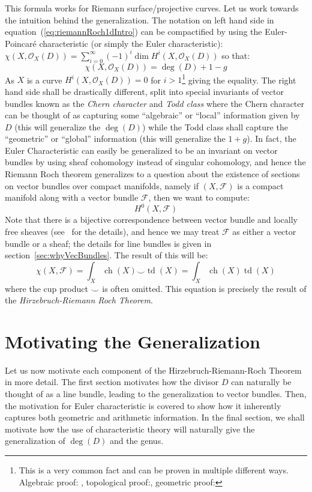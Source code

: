 \documentclass{ut-thesis}
\newcommand{\CF}{{\mathcal{F}}}
\newcommand{\CO}{{\mathcal{O}}}
\newcommand{\ch}{{\operatorname{ch}}}
\renewcommand{\deg}{{\operatorname{deg}}}
\newcommand{\td}{{\operatorname{td}}}
\renewcommand{\ch}{{\operatorname{ch}}}
\begin{document}
This formula works for Riemann surface/projective curves. Let us work towards the intuition behind the
generalization. The notation on left hand side in equation~(\ref{eq:riemannRoch1dIntro}) can be compactified
by using the Euler-Poincar\'e characteristic (or simply the Euler characteristic): $\chi(X, \CO_X(D)) =
\sum_{i=0}^\infty (-1)^i \dim H^i(X, \CO_X(D))$ so that:
\[
  \chi(X, \CO_X(D)) = \deg(D) + 1-g
\]
As $X$ is a curve $H^i(X, \CO_X(D)) = 0$ for $i > 1$\footnote{This is a very common fact and can be proven in
multiple different ways. Algebraic proof: \cite[section~28.3]{NateAlgGeo}, topological
proof:\cite[chapter~3]{NateAlgTop}, geometric proof:\cite[chapter~3]{NateKTheory}} giving the equality. The
right hand side shall be drastically different, split into special invariants of vector bundles known as the
\emph{Chern character} and \emph{Todd class} where the Chern character can be thought of as capturing some ``algebraic'' or
``local'' information given by $D$ (this will generalize the $\deg(D)$) while the Todd class shall capture the
``geometric'' or ``global'' information (this will generalize the $1+g$). In fact, the Euler Characteristic
can easily be generalized to be an invariant on vector bundles by using sheaf cohomology instead of singular
cohomology, and hence the Riemann Roch theorem generalizes to a question about the existence of sections on
vector bundles over compact manifolds, namely if $(X,\CF)$ is a compact manifold along with a vector bundle
$\CF$, then we want to compute:
\[
  H^0(X, \CF)
\]
Note that there is a bijective correspondence between vector bundle and locally free sheaves
(see~\cite[chapter~4]{NateAlgGeo} for the details), and hence we may treat $\CF$ as either a vector bundle or
a sheaf; the details for line bundles is given in section~\ref{sec:whyVecBundles}. The result of this will be:
\[
  \chi(X, \CF) = \int_X \ch(X)\smile \td(X) = \int_X \ch(X)\td(X)
\]
where the cup product $\smile$ is often omitted. This equation is precisely the result of the
\emph{Hirzebruch-Riemann Roch Theorem}.

\section{Motivating the Generalization}

Let us now motivate each component of the Hirzebruch-Riemann-Roch Theorem in more detail. The first section
motivates how the divisor $D$ can naturally be thought of as a line bundle, leading to the generalization to
vector bundles. Then, the motivation for Euler characteristic is covered to show how it inherently captures
both geometric and arithmetic information. In the final section, we shall motivate how the use of characteristic
theory will naturally give the generalization of $\deg(D)$ and the genus.
\end{document}
